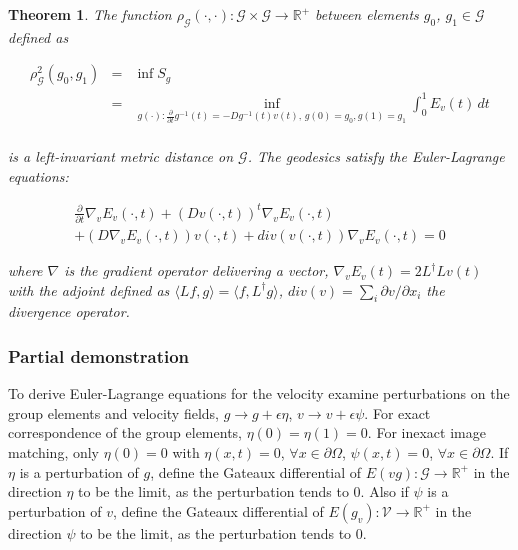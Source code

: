 \documentclass[final, paper=letter,5p,times,twocolumn]{elsarticle}
\newtheorem{theorem}{Theorem} %
\theoremstyle{definition}
\begin{document}
\begin{theorem}
  The function $\rho_{\mathcal{G}}(\cdot, \cdot): \mathcal{G} \times \mathcal{G} \rightarrow \mathbb{R}^{+}$ between elements $g_{0}$, $g_{1} \in \mathcal{G}$ defined as



\begin{eqnarray*}
  \rho_{\mathcal{G}}^{2}(g_{0}, g_{1}) & = & \inf S_{g} \\
  & = & \underset{g(\cdot):\frac{\partial}{\partial t}g^{-1}(t) = -Dg^{-1}(t)v(t),\, g(0)=g_{0}, g(1) = g_{1}}{\inf} \int_{0}^{1} E_{v}(t) \, dt \\
\end{eqnarray*}


is a left-invariant metric distance on $\mathcal{G}$. The geodesics satisfy the Euler-Lagrange equations:

\begin{eqnarray*}
  \frac{\partial}{\partial t} \nabla_{v}E_{v}(\cdot, t) + (Dv(\cdot, t))^{t} \nabla_{v}E_{v}(\cdot, t) \\
  + (D \nabla_{v}E_{v}(\cdot, t))v(\cdot, t) + div( v(\cdot, t)) \nabla_{v}E_{v}(\cdot, t) = 0
\end{eqnarray*}

where $\nabla$ is the gradient operator delivering a vector, $\nabla_{v}E_{v}(t) = 2L^{\dag}Lv(t)$ with the adjoint defined as $\langle Lf, g\rangle = \langle f, L^{\dag}g \rangle$, $div(v) = \sum_{i} \partial v/ \partial x_{i}$ the divergence operator.
\end{theorem}



\subsubsection{Partial demonstration}

To derive Euler-Lagrange equations for the velocity examine perturbations on the group elements and velocity fields, $g \rightarrow g + \epsilon \eta$, $v \rightarrow v + \epsilon \psi$. For exact correspondence of the group elements, $\eta(0) = \eta(1) = 0$. For inexact image matching, only $\eta(0) = 0$ with $\eta(x, t) = 0$, $\forall x \in \partial \Omega$, $\psi(x, t) = 0$, $\forall x \in \partial \Omega$. If $\eta$ is a perturbation of $g$, define the Gateaux differential of $E(v g): \mathcal{G} \rightarrow \mathbb{R}^{+}$ in the direction $\eta$ to be the limit, as the perturbation tends to 0. Also if $\psi$ is a perturbation of $v$, define the Gateaux differential of $E(g_{v}): \mathcal{V} \rightarrow \mathbb{R}^{+}$ in the direction $\psi$ to be the limit, as the perturbation tends to 0.
\end{document}
